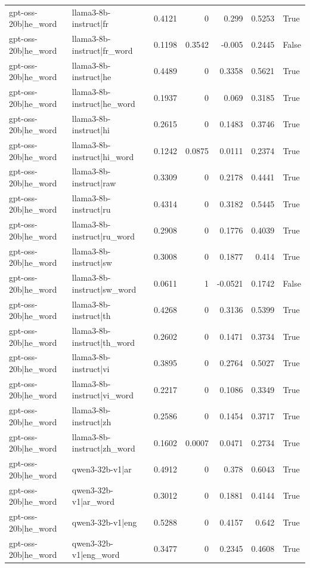 \begin{table}
\begin{tabular}{l l r r r r l}
gpt-oss-20b|he_word & llama3-8b-instruct|fr & 0.4121 & 0 & 0.299 & 0.5253 & True \\
gpt-oss-20b|he_word & llama3-8b-instruct|fr_word & 0.1198 & 0.3542 & -0.005 & 0.2445 & False \\
gpt-oss-20b|he_word & llama3-8b-instruct|he & 0.4489 & 0 & 0.3358 & 0.5621 & True \\
gpt-oss-20b|he_word & llama3-8b-instruct|he_word & 0.1937 & 0 & 0.069 & 0.3185 & True \\
gpt-oss-20b|he_word & llama3-8b-instruct|hi & 0.2615 & 0 & 0.1483 & 0.3746 & True \\
gpt-oss-20b|he_word & llama3-8b-instruct|hi_word & 0.1242 & 0.0875 & 0.0111 & 0.2374 & True \\
gpt-oss-20b|he_word & llama3-8b-instruct|raw & 0.3309 & 0 & 0.2178 & 0.4441 & True \\
gpt-oss-20b|he_word & llama3-8b-instruct|ru & 0.4314 & 0 & 0.3182 & 0.5445 & True \\
gpt-oss-20b|he_word & llama3-8b-instruct|ru_word & 0.2908 & 0 & 0.1776 & 0.4039 & True \\
gpt-oss-20b|he_word & llama3-8b-instruct|sw & 0.3008 & 0 & 0.1877 & 0.414 & True \\
gpt-oss-20b|he_word & llama3-8b-instruct|sw_word & 0.0611 & 1 & -0.0521 & 0.1742 & False \\
gpt-oss-20b|he_word & llama3-8b-instruct|th & 0.4268 & 0 & 0.3136 & 0.5399 & True \\
gpt-oss-20b|he_word & llama3-8b-instruct|th_word & 0.2602 & 0 & 0.1471 & 0.3734 & True \\
gpt-oss-20b|he_word & llama3-8b-instruct|vi & 0.3895 & 0 & 0.2764 & 0.5027 & True \\
gpt-oss-20b|he_word & llama3-8b-instruct|vi_word & 0.2217 & 0 & 0.1086 & 0.3349 & True \\
gpt-oss-20b|he_word & llama3-8b-instruct|zh & 0.2586 & 0 & 0.1454 & 0.3717 & True \\
gpt-oss-20b|he_word & llama3-8b-instruct|zh_word & 0.1602 & 0.0007 & 0.0471 & 0.2734 & True \\
gpt-oss-20b|he_word & qwen3-32b-v1|ar & 0.4912 & 0 & 0.378 & 0.6043 & True \\
gpt-oss-20b|he_word & qwen3-32b-v1|ar_word & 0.3012 & 0 & 0.1881 & 0.4144 & True \\
gpt-oss-20b|he_word & qwen3-32b-v1|eng & 0.5288 & 0 & 0.4157 & 0.642 & True \\
gpt-oss-20b|he_word & qwen3-32b-v1|eng_word & 0.3477 & 0 & 0.2345 & 0.4608 & True \\

\end{tabular}
\end{table}
